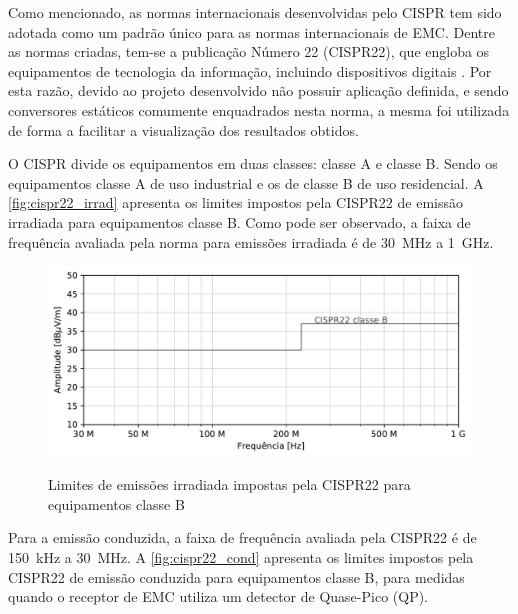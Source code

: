            Como mencionado, as normas internacionais desenvolvidas pelo CISPR tem sido adotada como um padrão único para as normas internacionais de EMC. Dentre as normas criadas, tem-se a publicação Número 22 (CISPR22), que engloba os equipamentos de tecnologia da informação, incluindo dispositivos digitais \cite{ref:EMC_phd_schlichting}. 
            Por esta razão, devido ao projeto desenvolvido não possuir aplicação definida, e sendo conversores estáticos comumente enquadrados nesta norma, a mesma foi utilizada de forma a facilitar a visualização dos resultados obtidos. 
            
            O CISPR divide os equipamentos em duas classes: classe A e classe B. Sendo os equipamentos classe A de uso industrial e os de classe B de uso residencial. A \autoref{fig:cispr22_irrad} apresenta os limites impostos pela CISPR22 de emissão irradiada para equipamentos classe B. Como pode ser observado, a  faixa de frequência avaliada pela norma para emissões irradiada é de \SI{30}{\mega\hertz} a  \SI{1}{\giga\hertz}.
            
            \begin{figure}[H]
            	\centering
            	\caption{Limites de emissões irradiada impostas pela CISPR22 para equipamentos classe B}
            	\includegraphics[scale=.9]{pdf/rad/norma_rad.pdf}
            	\label{fig:cispr22_irrad}
            \end{figure}
            
            Para a emissão conduzida, a faixa de frequência avaliada pela CISPR22 é de \SI{150}{\kilo\hertz} a  \SI{30}{\mega\hertz}. A \autoref{fig:cispr22_cond} apresenta os limites impostos pela CISPR22 de emissão conduzida para equipamentos classe B, para medidas quando o receptor de EMC utiliza um detector de Quase-Pico (QP).
            
